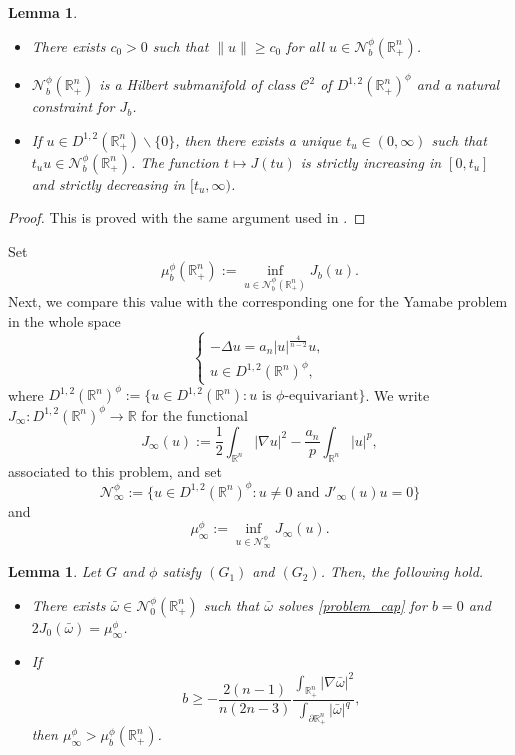 \documentclass[reqno,11pt,oneside]{amsart}
\newtheorem{lemma}[theorem]{Lemma}
\numberwithin{equation}{section}
\def\r{\mathbb{R}}
\def\rn{\mathbb{R}^n}
\def\hn{\mathbb{R}^n_+}
\def\irn{\int_{\rn}}
\def\ihn{\int_{\hn}}
\def\idhn{\int_{\partial\hn}}
\def\cC{\mathcal{C}}
\def\cN{\mathcal{N}}
\begin{document}
\begin{lemma}\label{lem:nehari}
\begin{itemize}
\item[$(a)$]There exists $c_0>0$ such that $\|u\|\geq c_0$ for all $u\in\cN^\phi_b(\hn)$.
\item[$(b)$]$\cN^\phi_b(\hn)$ is a Hilbert submanifold of class $\cC^2$ of $D^{1,2}(\hn)^\phi$ and a natural constraint for $J_b$.
\item[$(c)$]If $u\in D^{1,2}(\hn)\smallsetminus\{0\}$, then there exists a unique $t_u\in(0,\infty)$ such that $t_uu\in\cN^\phi_b(\hn)$. The function $t\mapsto J(tu)$ is strictly increasing in $[0,t_u]$ and strictly decreasing in $[t_u,\infty)$.
\end{itemize}
\end{lemma}

\begin{proof}
This is proved with the same argument used in \cite[Lemma 2.1]{cpp}.
\end{proof}

Set
$$\mu^\phi_b(\hn):=\inf_{u\in\cN^\phi_b(\hn)}J_b(u).$$
Next, we compare this value with the corresponding one for the Yamabe problem in the whole space
\begin{equation}\label{problem_rn}
\begin{cases}
 -\Delta u = a_n|u|^\frac{4}{n-2}u,\\
 u\in D^{1,2}(\rn)^\phi,
\end{cases}
\end{equation}
where $D^{1,2}(\rn)^\phi:=\{u\in D^{1,2}(\rn):u\text{ \ is \ }\phi\text{-equivariant}\}$. We write $J_\infty:D^{1,2}(\rn)^\phi\to\r$ for the functional
$$J_\infty(u):=\frac{1}{2}\irn|\nabla u|^2 - \frac{a_n}{p}\irn|u|^p,$$
associated to this problem, and set 
$$\cN_\infty^\phi:=\{u\in D^{1,2}(\rn)^\phi: u\neq 0 \text{ and }J'_\infty(u)u=0\} $$ 
and
$$\mu^\phi_\infty:=\inf_{u\in\cN^\phi_\infty}J_\infty(u).$$

\begin{lemma} \label{lem:comparison}
Let $G$ and $\phi$ satisfy $(G_1)$ and $(G_2)$. Then, the following hold.
\begin{itemize}
\item[$(i)$] There exists $\bar{\omega}\in\cN^\phi_0(\hn)$ such that $\bar{\omega}$ solves \eqref{problem_cap} for $b=0$ and $2J_0(\bar{\omega})=\mu^\phi_\infty$.
\item[$(ii)$] If
\begin{equation}\label{eq:b}
b\geq -\frac{2(n-1)}{n(2n-3)}\frac{\ihn|\nabla \bar{\omega}|^2}{\idhn |\bar{\omega}|^q},
\end{equation}
then $\mu^\phi_\infty>\mu^\phi_b(\hn)$. 
\end{itemize}
\end{lemma}
\end{document}
